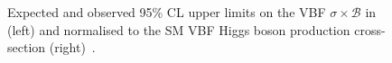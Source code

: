 \begin{figure}
  \caption{Expected and observed 95\% CL upper limits on the \ac{VBF} $\sigma\times\mathcal{B}$ in \pb (left) and normalised to the SM \ac{VBF} Higgs boson production cross-section (right)~\cite{Chatrchyan:2014tja}.}
  \label{fig:promptlimits}
\end{figure}
